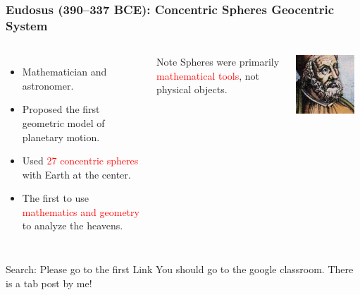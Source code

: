 \documentclass[aspectratio=1611, 9pt]{beamer}
\begin{document}
\begin{frame}
  \frametitle{Eudosus (390–337 BCE): Concentric Spheres Geocentric System}
  \begin{columns}
    \begin{itemize}
      \item Mathematician and astronomer.
      \item Proposed the first geometric model of planetary motion.
      \item Used \textcolor{red}{27 concentric spheres} with Earth at the center.
      \item The first to use \textcolor{red}{mathematics and geometry} to analyze the heavens.
    \end{itemize}
    \begin{alertblock}{Note}
      Spheres were primarily \textcolor{red}{mathematical tools}, not physical objects.
    \end{alertblock}

    \begin{center}
      \includegraphics[width=0.9\textwidth]{pictures/eudosus.jpg}
    \end{center}
  \end{columns}  
\end{frame}

\begin{frame}
  \begin{block}{Search: Please go to the first Link}
    You should go to the google classroom. There is a tab post by me!
  \end{block}
\end{frame}
\end{document}
